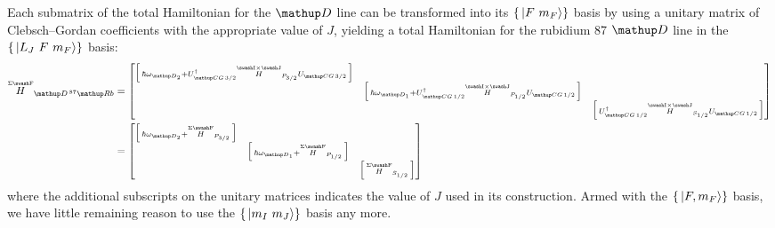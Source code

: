 Each submatrix of the total Hamiltonian for the $\up{D}$ line can be transformed into its $\{\ket{F\ m_F}\}$ basis by using a unitary matrix of Clebsch--Gordan coefficients with the appropriate value of $J$, yielding a total Hamiltonian for the rubidium 87 $\up{D}$ line in the $\{\ket{L_J\ F\ m_F}\}$ basis:
\begin{align}
\oversetF{H}_{\up{D}\,^{87}\up{Rb}}
&= \left[\begin{matrix}
    \left[\begin{smallmatrix}
        \hbar\omega_{\up{D}_2}+U^\dagger_{\up{CG}\,3/2}
        \oversetIJ H_{P_{3/2}}U_{\up{CG}\,3/2}\\
        \end{smallmatrix} \right]\\
    & \left[\begin{smallmatrix}
        \hbar\omega_{\up{D}_1}+U^\dagger_{\up{CG}\,1/2}
        \oversetIJ H_{P_{1/2}}U_{\up{CG}\,1/2}\\
      \end{smallmatrix} \right]\\
    & &\left[\begin{smallmatrix}
        U^\dagger_{\up{CG}\,1/2} 
        \oversetIJ H_{S_{1/2}} U_{\up{CG}\,1/2}\\
    \end{smallmatrix} \right]\\
\end{matrix} \right]\\
&= \left[\begin{matrix}
    \left[\begin{smallmatrix}
        \hbar\omega_{\up{D}_2} +
        \oversetF H_{P_{3/2}}\\
        \end{smallmatrix} \right]\\
    & \left[\begin{smallmatrix}
        \hbar\omega_{\up{D}_1} +
        \oversetF H_{P_{1/2}}\\
      \end{smallmatrix} \right]\\
    & &\left[\begin{smallmatrix}
        \oversetF H_{S_{1/2}}\\
    \end{smallmatrix} \right]\\
\end{matrix} \right]
\end{align}
where the additional subscripts on the unitary matrices indicates the value of $J$ used in its construction. Armed with the $\{\ket{F, m_F}\}$ basis, we have little remaining reason to use the $\{\ket{m_I\ m_J}\}$ basis any more.

